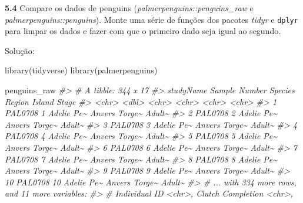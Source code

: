 \documentclass[
]{book}
\newenvironment{Shaded}{\begin{snugshade}}{\end{snugshade}}
\newcommand{\CommentTok}[1]{\textcolor[rgb]{0.56,0.35,0.01}{\textit{#1}}}
\newcommand{\FunctionTok}[1]{\textcolor[rgb]{0.00,0.00,0.00}{#1}}
\newcommand{\NormalTok}[1]{#1}
\begin{document}
\textbf{5.4}
Compare os dados de penguins (\emph{palmerpenguins::penguins\_raw} e \emph{palmerpenguins::penguins}). Monte uma série de funções dos pacotes \emph{tidyr} e \texttt{dplyr} para limpar os dados e fazer com que o primeiro dado seja igual ao segundo.

Solução:

\begin{Shaded}
\begin{Highlighting}[]
\FunctionTok{library}\NormalTok{(tidyverse)}
\FunctionTok{library}\NormalTok{(palmerpenguins)}

\NormalTok{penguins\_raw}
\CommentTok{\#\textgreater{} \# A tibble: 344 x 17}
\CommentTok{\#\textgreater{}    studyName \textasciigrave{}Sample Number\textasciigrave{} Species    Region Island Stage }
\CommentTok{\#\textgreater{}    \textless{}chr\textgreater{}               \textless{}dbl\textgreater{} \textless{}chr\textgreater{}      \textless{}chr\textgreater{}  \textless{}chr\textgreater{}  \textless{}chr\textgreater{} }
\CommentTok{\#\textgreater{}  1 PAL0708                 1 Adelie Pe\textasciitilde{} Anvers Torge\textasciitilde{} Adult\textasciitilde{}}
\CommentTok{\#\textgreater{}  2 PAL0708                 2 Adelie Pe\textasciitilde{} Anvers Torge\textasciitilde{} Adult\textasciitilde{}}
\CommentTok{\#\textgreater{}  3 PAL0708                 3 Adelie Pe\textasciitilde{} Anvers Torge\textasciitilde{} Adult\textasciitilde{}}
\CommentTok{\#\textgreater{}  4 PAL0708                 4 Adelie Pe\textasciitilde{} Anvers Torge\textasciitilde{} Adult\textasciitilde{}}
\CommentTok{\#\textgreater{}  5 PAL0708                 5 Adelie Pe\textasciitilde{} Anvers Torge\textasciitilde{} Adult\textasciitilde{}}
\CommentTok{\#\textgreater{}  6 PAL0708                 6 Adelie Pe\textasciitilde{} Anvers Torge\textasciitilde{} Adult\textasciitilde{}}
\CommentTok{\#\textgreater{}  7 PAL0708                 7 Adelie Pe\textasciitilde{} Anvers Torge\textasciitilde{} Adult\textasciitilde{}}
\CommentTok{\#\textgreater{}  8 PAL0708                 8 Adelie Pe\textasciitilde{} Anvers Torge\textasciitilde{} Adult\textasciitilde{}}
\CommentTok{\#\textgreater{}  9 PAL0708                 9 Adelie Pe\textasciitilde{} Anvers Torge\textasciitilde{} Adult\textasciitilde{}}
\CommentTok{\#\textgreater{} 10 PAL0708                10 Adelie Pe\textasciitilde{} Anvers Torge\textasciitilde{} Adult\textasciitilde{}}
\CommentTok{\#\textgreater{} \# ... with 334 more rows, and 11 more variables:}
\CommentTok{\#\textgreater{} \#   Individual ID \textless{}chr\textgreater{}, Clutch Completion \textless{}chr\textgreater{},}

\end{Highlighting}
\end{Shaded}
\end{document}
